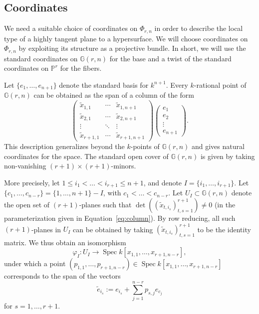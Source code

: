 \documentclass[12pt]{amsart}
\numberwithin{equation}{section}
\theoremstyle{plain}
\theoremstyle{definition}
\newcommand{\mb}[1]{\mathbb{#1}}
\newcommand{\vphi}{\varphi}
\newcommand{\Spec}{\operatorname{Spec}}
\begin{document}
\subsection{Coordinates}\label{sec:coordinates}
We need a suitable choice of coordinates on $\Phi_{r,n}$ in order to describe the local type of a highly tangent plane to a hypersurface. We will choose coordinates on $\Phi_{r,n}$ by exploiting its structure as a projective bundle. In short, we will use the standard coordinates on $\mb{G}(r,n)$ for the base and a twist of the standard coordinates on $\mb{P}^r$ for the fibers.

Let $\{e_1,\ldots,e_{n+1}\}$ denote the standard basis for $k^{n+1}$. Every $k$-rational point of $\mb{G}(r,n)$ can be obtained as the span of a column of the form
\begin{equation}\label{eq:column}
\begin{pmatrix}
    \tilde{x}_{1,1} & \cdots & \tilde{x}_{1,n+1}\\
    \tilde{x}_{2,1} & \cdots & \tilde{x}_{2,n+1}\\
    \vdots & \ddots & \vdots\\
    \tilde{x}_{r+1,1} & \cdots & \tilde{x}_{r+1,n+1}
\end{pmatrix}
\begin{pmatrix}
e_1 \\ e_2 \\ \vdots \\ e_{n+1}
\end{pmatrix}.\end{equation}
This description generalizes beyond the $k$-points of $\mb{G}(r,n)$ and gives natural coordinates for the space. The standard open cover of $\mb{G}(r,n)$ is given by taking non-vanishing $(r+1)\times(r+1)$-minors. 

More precisely, let $1\leq i_1<\ldots<i_{r+1}\leq n+1$, and denote $I=\{i_1,\ldots,i_{r+1}\}$. Let $\{c_1,\ldots,c_{n-r}\}=\{1,\ldots,n+1\}-I$, with $c_1<\ldots<c_{n-r}$. Let $U_I\subset\mb{G}(r,n)$ denote the open set of $(r+1)$-planes such that $\det((\tilde{x}_{t,i_s})_{t,s=1}^{r+1})\neq 0$ (in the parameterization given in Equation~\ref{eq:column}). By row reducing, all such $(r+1)$-planes in $U_I$ can be obtained by taking $(\tilde{x}_{t,i_s})_{t,s=1}^{r+1}$ to be the identity matrix. We thus obtain an isomorphism
\[\vphi_I\colon U_I\to\Spec k[x_{1,1},\ldots,x_{r+1,n-r}],\]
under which a point $(p_{1,1},\ldots,p_{r+1,n-r})\in\Spec k[x_{1,1},\ldots,x_{r+1,n-r}]$ corresponds to the span of the vectors
\[\tilde{e}_{i_s}:=e_{i_s}+\sum_{j=1}^{n-r}p_{s,j}e_{c_j}\]
for $s=1,\ldots,r+1$.
\end{document}
